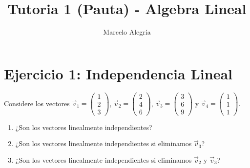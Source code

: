 \documentclass[11pt]{article}
\title{\textbf{Tutoria 1 (Pauta) - Algebra Lineal}}
\author{Marcelo Alegría}
\date{}
\begin{document}
\maketitle

\section*{Ejercicio 1: Independencia Lineal}

\begin{tcolorbox}[colback=blue1!10, colframe=blue1, title=Enunciado]
Considere los vectores $\vec{v}_{1}=\begin{pmatrix}1\\ 2\\ 3\end{pmatrix}$, 
$\vec{v}_{2}=\begin{pmatrix}2\\ 4\\ 6\end{pmatrix}$, 
$\vec{v}_{3}=\begin{pmatrix}3\\ 6\\ 9\end{pmatrix}$ y 
$\vec{v}_{4}=\begin{pmatrix}1\\ 1\\ 1\end{pmatrix}$.

\begin{enumerate}[label=\alph*)]
    \item ¿Son los vectores linealmente independientes?
    \item ¿Son los vectores linealmente independientes si eliminamos $\vec{v}_{3}$?
    \item ¿Son los vectores linealmente independientes si eliminamos $\vec{v}_{2}$ y $\vec{v}_{3}$?
\end{enumerate}
\end{tcolorbox}
\end{document}
